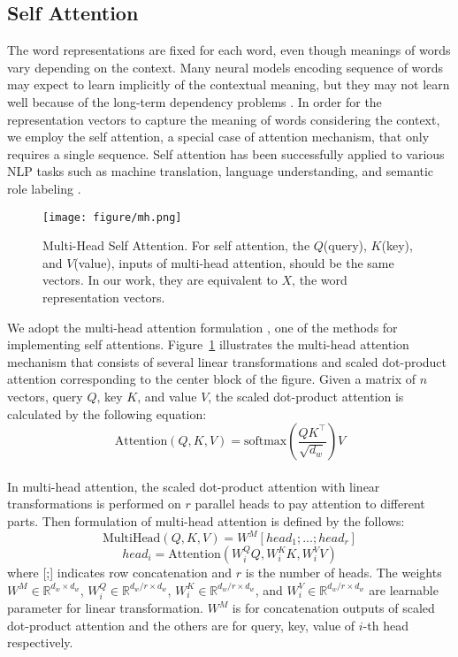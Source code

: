 \documentclass[twoside,leqno,twocolumn]{article}
\begin{document}
\subsection{Self Attention}
The word representations are fixed for each word, even though meanings of words vary depending on the context.
Many neural models encoding sequence of words may expect to learn implicitly of the contextual meaning, but they may not learn well because of the long-term dependency problems \cite{bengio1994learning}.
In order for the representation vectors to capture the meaning of words considering the context, we employ the self attention, a special case of attention mechanism, that only requires a single sequence.
Self attention has been successfully applied to various NLP tasks such as machine translation, language understanding, and semantic role labeling \cite{vaswani2017attention, shen2017disan, tan2017deep}.

\begin{figure}[!ht]
\centering
\texttt{[image: figure/mh.png]}
\caption{Multi-Head Self Attention. For self attention, the $Q$(query), $K$(key), and $V$(value), inputs of multi-head attention, should be the same vectors. In our work, they are equivalent to $X$, the word representation vectors.}
\label{fig:mh}
\end{figure}

We adopt the multi-head attention formulation \cite{vaswani2017attention}, one of the methods for implementing self attentions.
Figure~\ref{fig:mh} illustrates the multi-head attention mechanism that consists of several linear transformations and scaled dot-product attention corresponding to the center block of the figure. 
Given a matrix of $n$ vectors, query $Q$, key $K$, and value $V$, the scaled dot-product attention is calculated by the following equation:
\begin{equation}
\text{Attention}(Q, K, V)=\text{softmax}(\frac{QK^{\top}}{\sqrt{d_w}})V
\label{e3.1}
\end{equation}\\
In multi-head attention, the scaled dot-product attention with linear transformations is performed on $r$ parallel heads to pay attention to different parts.
Then formulation of multi-head attention is defined by the follows:
\begin{equation} 
\text{MultiHead}(Q, K, V)=W^{M}[head_1; ...; head_{r}]
\label{e3.2}
\end{equation}
\begin{equation} 
head_i=\text{Attention}(W_i^QQ, W_i^KK, W_i^VV)
\label{e3.3}
\end{equation}
where [;] indicates row concatenation and $r$ is the number of heads.
The weights $W^{M}\in \mathbb{R}^{d_w\times d_w}$, $W_i^Q\in \mathbb{R}^{d_w/r\times d_w}$, $W_i^K\in \mathbb{R}^{d_w/r\times d_w}$, and $W_i^V\in \mathbb{R}^{d_w/r\times d_w}$ are learnable parameter for linear transformation. $W^{M}$ is for concatenation outputs of scaled dot-product attention and the others are for query, key, value of $i$-th head respectively.
\end{document}
